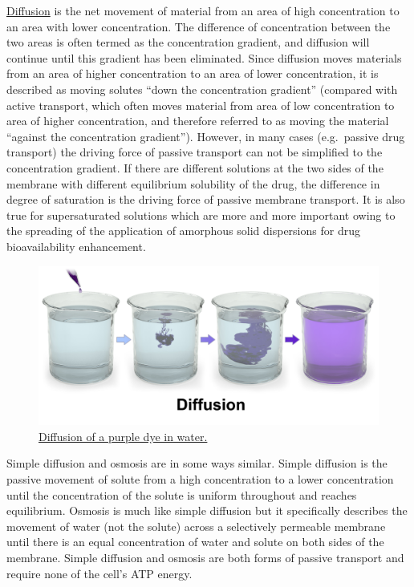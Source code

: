 \href{https://en.wikipedia.org/wiki/Diffusion}{Diffusion} is the net movement of material from an area of high concentration to an area with lower concentration. The difference of concentration between the two areas is often termed as the concentration gradient, and diffusion will continue until this gradient has been eliminated. Since diffusion moves materials from an area of higher concentration to an area of lower concentration, it is described as moving solutes ``down the concentration gradient'' (compared with active transport, which often moves material from area of low concentration to area of higher concentration, and therefore referred to as moving the material ``against the concentration gradient''). However, in many cases (e.g.~passive drug transport) the driving force of passive transport can not be simplified to the concentration gradient. If there are different solutions at the two sides of the membrane with different equilibrium solubility of the drug, the difference in degree of saturation is the driving force of passive membrane transport. It is also true for supersaturated solutions which are more and more important owing to the spreading of the application of amorphous solid dispersions for drug bioavailability enhancement.

\begin{figure}

{\centering \includegraphics[width=0.7\linewidth]{./figures/membrane/Blausen_0315_Diffusion} 

}

\caption{\href{https://commons.wikimedia.org/wiki/File:Blausen_0315_Diffusion.png}{Diffusion of a purple dye in water.}}\label{fig:diffusion}
\end{figure}

Simple diffusion and osmosis are in some ways similar. Simple diffusion is the passive movement of solute from a high concentration to a lower concentration until the concentration of the solute is uniform throughout and reaches equilibrium. Osmosis is much like simple diffusion but it specifically describes the movement of water (not the solute) across a selectively permeable membrane until there is an equal concentration of water and solute on both sides of the membrane. Simple diffusion and osmosis are both forms of passive transport and require none of the cell's ATP energy.

